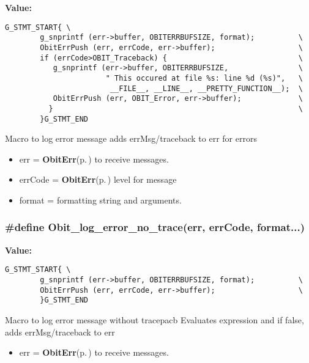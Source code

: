 {\bf Value:}

\footnotesize\begin{verbatim}G_STMT_START{ \
        g_snprintf (err->buffer, OBITERRBUFSIZE, format);          \
        ObitErrPush (err, errCode, err->buffer);                   \
        if (errCode>OBIT_Traceback) {                              \
           g_snprintf (err->buffer, OBITERRBUFSIZE,                \
                       " This occured at file %s: line %d (%s)",   \
                        __FILE__, __LINE__, __PRETTY_FUNCTION__);  \
           ObitErrPush (err, OBIT_Error, err->buffer);             \
          }                                                        \
        }G_STMT_END
\end{verbatim}\normalsize 
Macro to log error message adds err\-Msg/traceback to err for errors \begin{itemize}
\item err = {\bf Obit\-Err}{\rm (p.\,\pageref{structObitErr})} to receive messages. \end{itemize}


\begin{itemize}
\item err\-Code = {\bf Obit\-Err}{\rm (p.\,\pageref{structObitErr})} level for message \item format = formatting string and arguments. \end{itemize}
\subsubsection{\setlength{\rightskip}{0pt plus 5cm}\#define Obit\_\-log\_\-error\_\-no\_\-trace(err, err\-Code, format...)}\label{ObitErr_8h_a2}


{\bf Value:}

\footnotesize\begin{verbatim}G_STMT_START{ \
        g_snprintf (err->buffer, OBITERRBUFSIZE, format);          \
        ObitErrPush (err, errCode, err->buffer);                   \
        }G_STMT_END
\end{verbatim}\normalsize 
Macro to log error message without tracepacb Evaluates expression and if false, adds err\-Msg/traceback to err \begin{itemize}
\item err = {\bf Obit\-Err}{\rm (p.\,\pageref{structObitErr})} to receive messages. \end{itemize}


